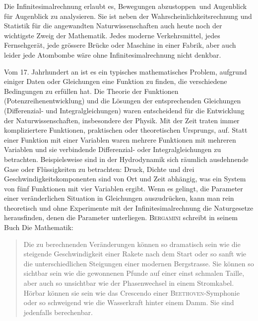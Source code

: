 \documentclass[%
11pt,%
twoside,%
titlepage,%
german,%
headsepline%
]{scrartcl}
\begin{document}
Die Infinitesimalrechnung erlaubt es, \glqq Bewegungen abzustoppen\grqq\ und Augenblick f\"ur Augenblick zu analysieren. Sie ist neben der Wahrscheinlichkeitsrechnung und Statistik f\"ur die angewandten Naturwissenschaften auch heute noch der wichtigste Zweig der Mathematik. Jedes moderne Verkehrsmittel, jedes Fernsehger\"at, jede gr\"ossere Br\"ucke oder Maschine in einer Fabrik, aber auch leider jede Atombombe w\"are ohne Infinitesimalrechnung nicht denkbar.

Vom 17. Jahrhundert an ist es ein typisches mathematisches Problem, aufgrund einiger Daten oder Gleichungen eine Funktion zu finden, die verschiedene Bedingungen zu erf\"ullen hat. Die Theorie der Funktionen (Potenzreihenentwicklung) und die L\"osungen der entsprechenden Gleichungen (Differenzial- und Integralgleichungen) waren entscheidend f\"ur die Entwicklung der Naturwissenschaften, insbesondere der Physik. Mit der Zeit traten immer kompliziertere Funktionen, praktischen oder theoretischen Ursprungs, auf. Statt einer Funktion mit einer Variablen waren mehrere Funktionen mit mehreren Variablen und sie verbindende Differenzial- oder Integralgleichungen zu betrachten. Beispielsweise sind in der Hydrodynamik sich r\"aumlich ausdehnende Gase oder Fl\"ussigkeiten zu betrachten: Druck, Dichte und drei Geschwindigkeitskomponenten sind von Ort und Zeit abh\"angig, was ein System von f\"unf Funktionen mit vier Variablen ergibt.
Wenn es gelingt, die Parameter einer ver\"anderlichen Situation in Gleichungen auszudr\"ucken, kann man rein theoretisch und ohne Experimente mit der Infinitesimalrechnung die Naturgesetze herausfinden, denen die Parameter unterliegen.
\textsc{Bergamini} schreibt in seinem Buch \glqq Die Mathematik\grqq:
\begin{quote}
\glqq Die zu berechnenden Ver\"anderungen k\"onnen so dramatisch sein wie die steigende Geschwindigkeit einer Rakete nach dem Start oder so sanft wie die unterschiedlichen Steigungen einer modernen Bergstrasse. Sie k\"onnen so sichtbar sein wie die gewonnenen Pfunde auf einer einst schmalen Taille, aber auch so unsichtbar wie der Phasenwechsel in einem Stromkabel. H\"orbar k\"onnen sie sein wie das Crescendo einer \textsc{Beethoven}-Symphonie oder so schweigend wie die Wasserkraft hinter einem Damm. Sie sind jedenfalls berechenbar.\grqq
\end{quote}

\clearpage
\end{document}
